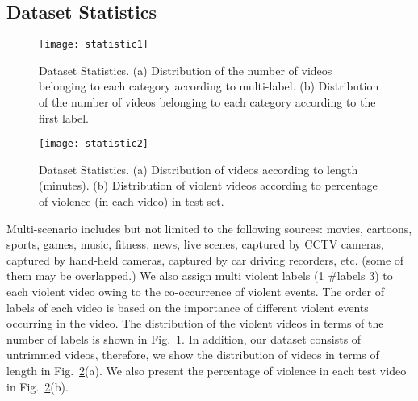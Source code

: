 \documentclass[runningheads]{llncs}
\begin{document}
\subsection{Dataset Statistics}
\begin{figure}[t]
\centering
\texttt{[image: statistic1]}
\caption{Dataset Statistics. (a) Distribution of the number of videos belonging to each category according to multi-label. (b) Distribution of the number of videos belonging to each category according to the first label.}
\label{fig:statistic1}
\end{figure}
\begin{figure}[!t]
\centering
\texttt{[image: statistic2]}
\caption{Dataset Statistics. (a) Distribution of videos according to length (minutes). (b) Distribution of violent videos according to percentage of violence (in each video) in test set.}
\label{fig:statistic2}
\end{figure}
Multi-scenario includes but not limited to the following sources: movies, cartoons, sports, games, music, fitness, news, live scenes, captured by CCTV cameras, captured by hand-held cameras, captured by car driving recorders, etc. (some of them may be overlapped.) We also assign multi violent labels (1  \#labels  3) to each violent video owing to the co-occurrence of violent events. The order of labels of each video is based on the importance of different violent events occurring in the video. The distribution of the violent videos in terms of the number of labels is shown in Fig.~\ref{fig:statistic1}. In addition, our dataset consists of untrimmed videos, therefore, we show the distribution of videos in terms of length in Fig.~\ref{fig:statistic2}(a). We also present the percentage of violence in each test video in Fig.~\ref{fig:statistic2}(b).
\end{document}
